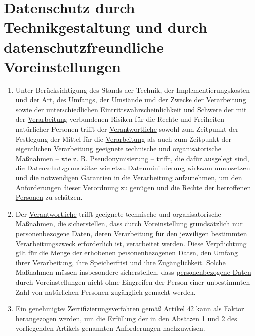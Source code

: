 \chapter{Datenschutz durch Technikgestaltung und durch datenschutzfreundliche Voreinstellungen}
\label{ch:25}


\begin{enumerate}

  \item Unter Berücksichtigung des Stands der Technik, der Implementierungskosten und der Art, des Umfangs, der Umstände
   und der Zwecke der \hyperref[itm:04-2]{Verarbeitung} sowie der unterschiedlichen Eintrittswahrscheinlichkeit und
   Schwere der mit der
   \hyperref[itm:04-2]{Verarbeitung} verbundenen Risiken für die Rechte und Freiheiten natürlicher Personen trifft
    der \hyperref[itm:04-7]{Verantwortliche} sowohl zum Zeitpunkt der Festlegung der Mittel für die \hyperref[itm:04-2]
    {Verarbeitung} als auch zum Zeitpunkt der eigentlichen
   \hyperref[itm:04-2]{Verarbeitung} geeignete technische und organisatorische Maßnahmen -- wie z. B. \hyperref
    [itm:04-5]{Pseudonymisierung} -- trifft, die dafür ausgelegt sind, die Datenschutzgrundsätze wie etwa
    Datenminimierung wirksam umzusetzen und die notwendigen Garantien in die \hyperref[itm:04-2]
    {Verarbeitung} aufzunehmen, um den Anforderungen dieser Verordnung zu genügen und die Rechte der \hyperref
    [itm:04-1]{betroffenen Personen} zu schützen.
  \label{itm:25-1}

  \item Der \hyperref[itm:04-7]{Verantwortliche} trifft geeignete technische und organisatorische Maßnahmen, die
   sicherstellen, dass durch Voreinstellung grundsätzlich nur \hyperref[itm:04-1]{personenbezogene Daten},
   deren \hyperref[itm:04-2]{Verarbeitung} für den jeweiligen bestimmten Verarbeitungszweck erforderlich ist,
   verarbeitet werden. Diese Verpflichtung gilt für die Menge der erhobenen
   \hyperref[itm:04-1]{personenbezogenen Daten}, den Umfang ihrer \hyperref[itm:04-2]{Verarbeitung}, ihre Speicherfrist
    und ihre Zugänglichkeit. Solche Maßnahmen müssen insbesondere sicherstellen, dass \hyperref[itm:04-1]
    {personenbezogene Daten} durch Voreinstellungen nicht ohne Eingreifen der Person einer unbestimmten Zahl von
    natürlichen Personen zugänglich gemacht werden.
  \label{itm:25-2}

  \item Ein genehmigtes Zertifizierungsverfahren gemäß \hyperref[ch:42]{Artikel 42} kann als Faktor herangezogen werden,
   um die Erfüllung der in den Absätzen \hyperref[itm:25-1]{1} und \hyperref[itm:25-2]{2} des vorliegenden Artikels
   genannten Anforderungen nachzuweisen.
  \label{itm:25-3}

\end{enumerate}


